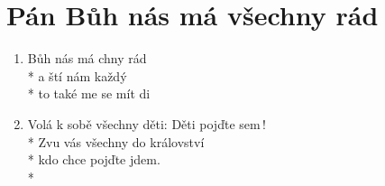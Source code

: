 \section{Pán Bůh nás má všechny rád}
\begin{enumerate}
\item {} Bůh nás má chny rád \\*
a ští nám každý  \\*
to také me se mít di 
\item Volá k sobě všechny děti: Děti pojďte sem\,! \\*
Zvu vás všechny do království \\*
kdo chce pojďte jdem. \\*
\end{enumerate}

